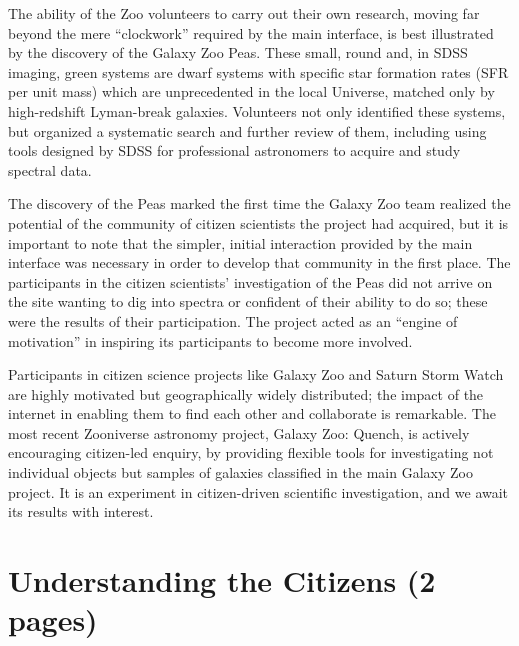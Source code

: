 \documentclass{ar2e}
\begin{document}
The ability of the Zoo volunteers to carry out their own research, moving far
beyond the mere ``clockwork'' required by the main interface, is best
illustrated by the discovery of the Galaxy Zoo Peas. These small, round and, in
SDSS imaging, green systems are dwarf systems with specific star formation rates
(SFR per unit mass) which are unprecedented in the local Universe, matched only
by high-redshift Lyman-break galaxies. Volunteers not only identified these
systems, but organized a systematic search and further review of them, including
using tools designed by SDSS for professional astronomers to acquire and study
spectral data. 

The discovery of the Peas marked the first time the Galaxy Zoo team realized the
potential of the community of citizen scientists the project had acquired, but
it is important to note that the simpler, initial interaction provided by the
main interface was necessary in order to develop that community in the first
place. The participants in the citizen scientists' investigation of the Peas did
not arrive on the site wanting to dig into spectra or confident of their ability
to do so; these were the results of their participation. The project  acted as
an ``engine of motivation'' in inspiring its participants to become more
involved. 


Participants in citizen science projects like Galaxy Zoo and Saturn Storm Watch 
are highly motivated but geographically widely distributed; the impact of the
internet in enabling them to find each other and collaborate is remarkable. The
most recent Zooniverse astronomy project, Galaxy Zoo: Quench, is actively
encouraging citizen-led enquiry, by providing flexible tools for investigating
not individual objects but samples of galaxies classified in the main Galaxy Zoo
project. It is an experiment in citizen-driven scientific investigation, and we
await its results with interest.


% 
% 




\section{Understanding the Citizens (2 pages)}
\label{sec:crowd}
\end{document}
